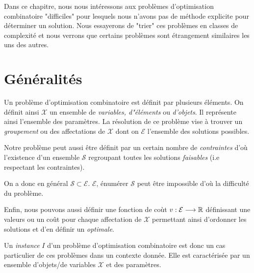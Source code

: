 \minitoc


Dans ce chapitre, nous nous intéressons aux problèmes d'optimisation combinatoire "difficiles"
pour lesquels nous n'avons pas de méthode explicite pour déterminer un solution. 
Nous essayerons de "trier" ces problèmes en classes de complexité et nous verrons que 
certains problèmes sont étrangement similaires les uns des autres.


\section{Généralités}

Un problème d'optimisation combinatoire est définit par plusieurs éléments. On définit 
ainsi $ \mathcal{X}$ un ensemble de \emph{variables, d"éléments} ou \emph{d'objets}. 
Il représente ainsi l'ensemble des paramètres. La résolution de ce problème vise à 
trouver un \emph{groupement} ou des affectations de $ \mathcal{X}$ dont on $ \mathcal{E}$
l'ensemble des solutions possibles. 

Notre problème peut aussi être définit par un certain nombre de \emph{contraintes} d'où l'existence
d'un ensemble $ \mathcal{S}$ regroupant toutes les solutions \emph{faisables} (i.e respectant les contraintes).

\begin{remark}
    On a donc en général $ \mathcal{S} \subset \mathcal{E}$. $ \mathcal{E}$, énumérer $ \mathcal{S}$ peut 
    être impossible d'où la difficulté du problème. 
\end{remark}

Enfin, nous pouvons aussi définir une fonction de coùt $v : \mathcal{E} \longrightarrow \mathbb{R}$ définissant 
une valeurs ou un coût pour chaque affectation de $ \mathcal{X}$ permettant ainsi d'ordonner les solutions 
et d'en définir un \emph{optimale}.

\begin{definition}[Instance]
    Un \emph{instance} $I$ d'un problème d'optimisation combinatoire est donc un cas particulier 
    de ces problèmes dans un contexte donnée. Elle est caractérisée par un ensemble d'objets/de variables 
    $ \mathcal{X}$ et des paramètres.
\end{definition}

